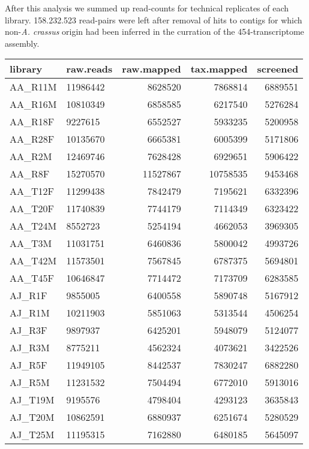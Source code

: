 After this analysis we summed up read-counts for technical replicates
of each library. 158.232.523 read-pairs were left after removal of
hits to contigs for which non-\textit{A. crassus} origin had been
inferred in the curration of the 454-transcriptome assembly.


\begin{table}[h]
\begin{center}
\begin{tabular}{llrrr}
  \hline
library & raw.reads & raw.mapped & tax.mapped & screened \\ 
  \hline
AA\_R11M & 11986442 & 8628520 & 7868814 & 6889551 \\ 
  AA\_R16M & 10810349 & 6858585 & 6217540 & 5276284 \\ 
  AA\_R18F & 9227615 & 6552527 & 5933235 & 5200958 \\ 
  AA\_R28F & 10135670 & 6665381 & 6005399 & 5171806 \\ 
  AA\_R2M & 12469746 & 7628428 & 6929651 & 5906422 \\ 
  AA\_R8F & 15270570 & 11527867 & 10758535 & 9453468 \\ 
  AA\_T12F & 11299438 & 7842479 & 7195621 & 6332396 \\ 
  AA\_T20F & 11740839 & 7744179 & 7114349 & 6323422 \\ 
  AA\_T24M & 8552723 & 5254194 & 4662053 & 3969305 \\ 
  AA\_T3M & 11031751 & 6460836 & 5800042 & 4993726 \\ 
  AA\_T42M & 11573501 & 7567845 & 6787375 & 5694801 \\ 
  AA\_T45F & 10646847 & 7714472 & 7173709 & 6283585 \\ 
  AJ\_R1F & 9855005 & 6400558 & 5890748 & 5167912 \\ 
  AJ\_R1M & 10211903 & 5851063 & 5313544 & 4506254 \\ 
  AJ\_R3F & 9897937 & 6425201 & 5948079 & 5124077 \\ 
  AJ\_R3M & 8775211 & 4562324 & 4073621 & 3422526 \\ 
  AJ\_R5F & 11949105 & 8442537 & 7830247 & 6882280 \\ 
  AJ\_R5M & 11231532 & 7504494 & 6772010 & 5913016 \\ 
  AJ\_T19M & 9195576 & 4798404 & 4293123 & 3635843 \\ 
  AJ\_T20M & 10862591 & 6880937 & 6251674 & 5280529 \\ 
  AJ\_T25M & 11195315 & 7162880 & 6480185 & 5645097 \\ 

\end{tabular}
\end{center}
\end{table}
